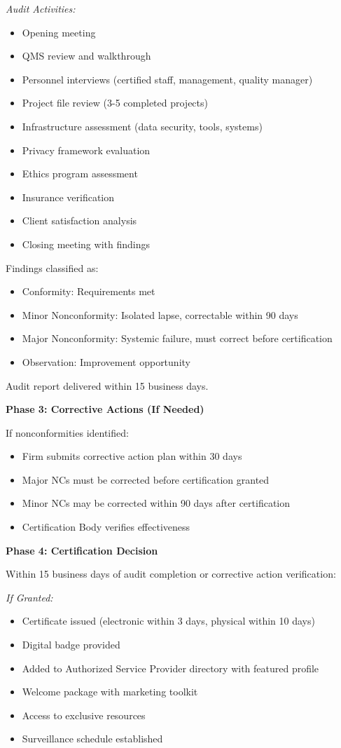 \documentclass[11pt,a4paper]{article}
\begin{document}
\textit{Audit Activities:}
\begin{itemize}
\item Opening meeting
\item QMS review and walkthrough
\item Personnel interviews (certified staff, management, quality manager)
\item Project file review (3-5 completed projects)
\item Infrastructure assessment (data security, tools, systems)
\item Privacy framework evaluation
\item Ethics program assessment
\item Insurance verification
\item Client satisfaction analysis
\item Closing meeting with findings
\end{itemize}

Findings classified as:
\begin{itemize}
\item Conformity: Requirements met
\item Minor Nonconformity: Isolated lapse, correctable within 90 days
\item Major Nonconformity: Systemic failure, must correct before certification
\item Observation: Improvement opportunity
\end{itemize}

Audit report delivered within 15 business days.

\textbf{Phase 3: Corrective Actions (If Needed)}

If nonconformities identified:
\begin{itemize}
\item Firm submits corrective action plan within 30 days
\item Major NCs must be corrected before certification granted
\item Minor NCs may be corrected within 90 days after certification
\item Certification Body verifies effectiveness
\end{itemize}

\textbf{Phase 4: Certification Decision}

Within 15 business days of audit completion or corrective action verification:

\textit{If Granted:}
\begin{itemize}
\item Certificate issued (electronic within 3 days, physical within 10 days)
\item Digital badge provided
\item Added to Authorized Service Provider directory with featured profile
\item Welcome package with marketing toolkit
\item Access to exclusive resources
\item Surveillance schedule established
\end{itemize}
\end{document}
